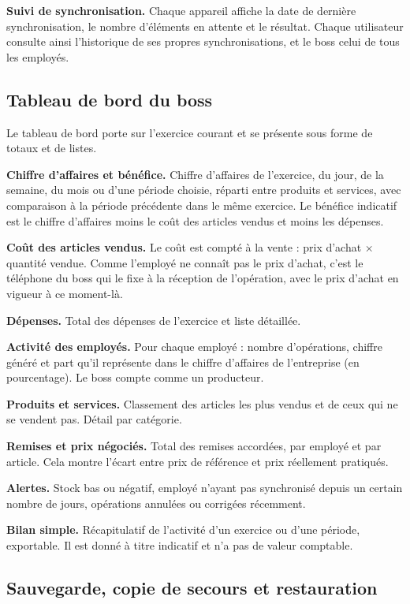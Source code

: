 \documentclass[11pt,a4paper]{article}
\newcommand{\fonc}[2]{\textbf{#1.} #2\par\vspace{0.2em}}
\begin{document}
	\fonc{Suivi de synchronisation}{Chaque appareil affiche la date de dernière synchronisation, le nombre d'éléments en attente et le résultat. Chaque utilisateur consulte ainsi l'historique de ses propres synchronisations, et le boss celui de tous les employés.}

	\subsection{Tableau de bord du boss}

	Le tableau de bord porte sur l'exercice courant et se présente sous forme de totaux et de listes.

	\fonc{Chiffre d'affaires et bénéfice}{Chiffre d'affaires de l'exercice, du jour, de la semaine, du mois ou d'une période choisie, réparti entre produits et services, avec comparaison à la période précédente dans le même exercice. Le bénéfice indicatif est le chiffre d'affaires moins le coût des articles vendus et moins les dépenses.}

	\fonc{Coût des articles vendus}{Le coût est compté à la vente : prix d'achat $\times$ quantité vendue. Comme l'employé ne connaît pas le prix d'achat, c'est le téléphone du boss qui le fixe à la réception de l'opération, avec le prix d'achat en vigueur à ce moment-là.}

	\fonc{Dépenses}{Total des dépenses de l'exercice et liste détaillée.}

	\fonc{Activité des employés}{Pour chaque employé : nombre d'opérations, chiffre généré et part qu'il représente dans le chiffre d'affaires de l'entreprise (en pourcentage). Le boss compte comme un producteur.}

	\fonc{Produits et services}{Classement des articles les plus vendus et de ceux qui ne se vendent pas. Détail par catégorie.}

	\fonc{Remises et prix négociés}{Total des remises accordées, par employé et par article. Cela montre l'écart entre prix de référence et prix réellement pratiqués.}

	\fonc{Alertes}{Stock bas ou négatif, employé n'ayant pas synchronisé depuis un certain nombre de jours, opérations annulées ou corrigées récemment.}

	\fonc{Bilan simple}{Récapitulatif de l'activité d'un exercice ou d'une période, exportable. Il est donné à titre indicatif et n'a pas de valeur comptable.}

	\subsection{Sauvegarde, copie de secours et restauration}
\end{document}
